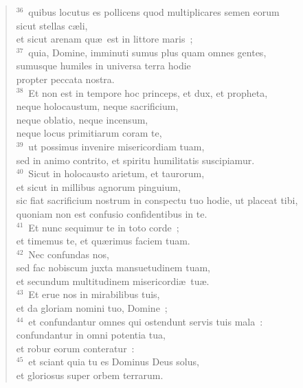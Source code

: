 \begin{flushleft}
\begin{verse}
${}^{36}$~quibus locutus es pollicens quod multiplicares semen eorum\\ sicut stellas c\ae li,\\ et sicut arenam qu\ae\ est in littore maris~;\\
${}^{37}$~quia, Domine, imminuti sumus plus quam omnes gentes,\\ sumusque humiles in universa terra hodie\\ propter peccata nostra.\\
${}^{38}$~Et non est in tempore hoc princeps, et dux, et propheta,\\ neque holocaustum, neque sacrificium,\\ neque oblatio, neque incensum,\\ neque locus primitiarum coram te,\\
${}^{39}$~ut possimus invenire misericordiam tuam,\\ sed in animo contrito, et spiritu humilitatis suscipiamur.\\
${}^{40}$~Sicut in holocausto arietum, et taurorum,\\ et sicut in millibus agnorum pinguium,\\ sic fiat sacrificium nostrum in conspectu tuo hodie, ut placeat tibi,\\ quoniam non est confusio confidentibus in te.\\
${}^{41}$~Et nunc sequimur te in toto corde~;\\ et timemus te, et qu\ae rimus faciem tuam.\\
${}^{42}$~Nec confundas nos,\\ sed fac nobiscum juxta mansuetudinem tuam,\\ et secundum multitudinem misericordi\ae\ tu\ae .\\
${}^{43}$~Et erue nos in mirabilibus tuis,\\ et da gloriam nomini tuo, Domine~;\\
${}^{44}$~et confundantur omnes qui ostendunt servis tuis mala~:\\ confundantur in omni potentia tua,\\ et robur eorum conteratur~:\\
${}^{45}$~et sciant quia tu es Dominus Deus solus,\\ et gloriosus super orbem terrarum.\end{verse}\end{flushleft}


